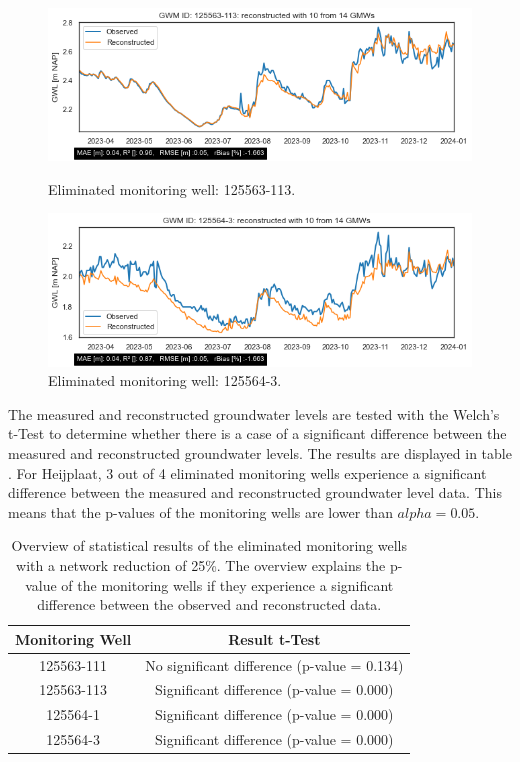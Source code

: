 \begin{figure}[h]
    \begin{minipage}{0.48\linewidth}
        \includegraphics[width=\linewidth]{frontmatter/Heijplaat-fig/125563113heij.png}
        \caption{Eliminated monitoring well: 125563-113.}
        \label{125563-113}
    \end{minipage}
    \hfill
    \begin{minipage}{0.48\linewidth}
        \includegraphics[width=\linewidth]{frontmatter/Heijplaat-fig/1255643heij.png}
        \caption{Eliminated monitoring well: 125564-3.}
        \label{hwell4}
    \end{minipage}
\end{figure}
\newline
The measured and reconstructed groundwater levels are tested with the Welch's t-Test to determine whether there is a case of a significant difference between the measured and reconstructed groundwater levels. The results are displayed in table .  For Heijplaat, 3 out of 4 eliminated monitoring wells experience a significant difference between the measured and reconstructed groundwater level data. This means that the p-values of the monitoring wells are lower than \(alpha = 0.05\).
\begin{table}[htbp]
    \centering
        \caption{Overview of statistical results of the eliminated monitoring wells with a network reduction of 25\%. The overview explains the p-value of the monitoring wells if they experience a significant difference between the observed and reconstructed data. }
    \begin{tabular}{|c|c|} \hline  
         Monitoring Well& Result t-Test\\ \hline  
         125563-111& No significant difference 
(p-value = 0.134)\\ \hline  
         125563-113& Significant difference (p-value = 0.000)\\ \hline  
 125564-1&Significant difference (p-value = 0.000)\\ \hline 
         125564-3& Significant difference (p-value = 0.000)\\ \hline 
    \end{tabular}
    \label{theij}
\end{table}
